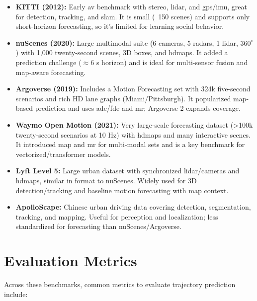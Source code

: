 \begin{itemize}
    \item \textbf{KITTI (2012):} Early \ac{av} benchmark with stereo, \ac{lidar}, and \ac{gps}/\ac{imu}, great for detection, tracking, and \ac{slam}. It is small (~150 scenes) and supports only short-horizon forecasting, so it’s limited for learning social behavior. \cite{Geiger2012KITTI}
    \item \textbf{nuScenes (2020):} Large multimodal suite (6 cameras, 5 radars, 1 \ac{lidar}, $360^\circ$) with 1{,}000 twenty-second scenes, 3D boxes, and \acp{hdmap}. It added a prediction challenge ($\approx 6$ s horizon) and is ideal for multi-sensor fusion and map-aware forecasting. \cite{Caesar2020nuScenes}
    \item \textbf{Argoverse (2019):} Includes a Motion Forecasting set with 324k five-second scenarios and rich HD lane graphs (Miami/Pittsburgh). It popularized map-based prediction and uses \acs{ade}/\acs{fde} and \acs{mr}; Argoverse 2 expands coverage. \cite{Chang2019Argoverse}
    \item \textbf{Waymo Open Motion (2021):} Very large-scale forecasting dataset (>100k twenty-second scenarios at 10 Hz) with \acp{hdmap} and many interactive scenes. It introduced \acs{map} and \acs{mr} for multi-modal sets and is a key benchmark for vectorized/transformer models. \cite{Ettinger2021WOMD}
    \item \textbf{Lyft Level 5:} Large urban dataset with synchronized \ac{lidar}/cameras and \acp{hdmap}, similar in format to nuScenes. Widely used for 3D detection/tracking and baseline motion forecasting with map context. \cite{Kesten2019Lyft}
    \item \textbf{ApolloScape:} Chinese urban driving data covering detection, segmentation, tracking, and mapping. Useful for perception and localization; less standardized for forecasting than nuScenes/Argoverse. \cite{Huang2018ApolloScape}
    \end{itemize}

\section{Evaluation Metrics}
\label{sec:sota-metrics}

Across these benchmarks, common metrics to evaluate trajectory prediction \cite{madjid2025survey,Ettinger2021WOMD} include:

